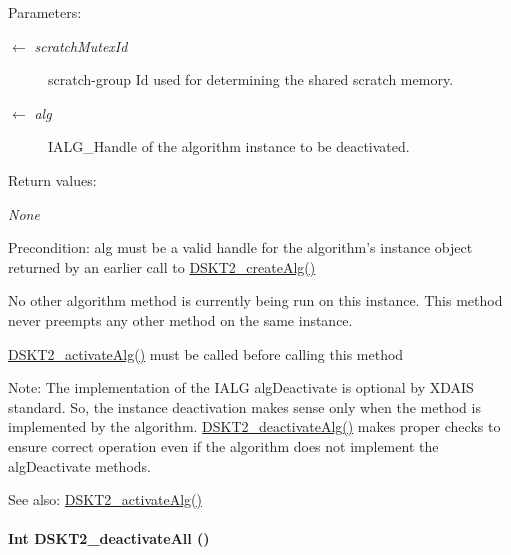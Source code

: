 \begin{Desc}
\item[Parameters:]
\begin{description}
\item[\mbox{$\leftarrow$} {\em scratch\-Mutex\-Id}]scratch-group Id used for determining the shared scratch memory. \item[\mbox{$\leftarrow$} {\em alg}]IALG\_\-Handle of the algorithm instance to be deactivated.\end{description}
\end{Desc}
\begin{Desc}
\item[Return values:]
\begin{description}
\item[{\em None}]\end{description}
\end{Desc}
\begin{Desc}
\item[Precondition:]alg must be a valid handle for the algorithm's instance object returned by an earlier call to \hyperlink{group___d_s_p_d_s_k_t2_g5528d73c34724bc310404da0dc2fbd69}{DSKT2\_\-create\-Alg()}

No other algorithm method is currently being run on this instance. This method never preempts any other method on the same instance.

\hyperlink{group___d_s_p_d_s_k_t2_gf946d426d6d9a95040d3967fa746cd7a}{DSKT2\_\-activate\-Alg()} must be called before calling this method\end{Desc}
\begin{Desc}
\item[Note:]The implementation of the IALG alg\-Deactivate is optional by XDAIS standard. So, the instance deactivation makes sense only when the method is implemented by the algorithm. \hyperlink{group___d_s_p_d_s_k_t2_g74b6b6feca63328906acade37d23b597}{DSKT2\_\-deactivate\-Alg()} makes proper checks to ensure correct operation even if the algorithm does not implement the alg\-Deactivate methods.\end{Desc}
\begin{Desc}
\item[See also:]\hyperlink{group___d_s_p_d_s_k_t2_gf946d426d6d9a95040d3967fa746cd7a}{DSKT2\_\-activate\-Alg()} \end{Desc}
\hypertarget{group___d_s_p_d_s_k_t2_g2d252c736a3bb828d9f646cc379ac0e2}{
\paragraph[DSKT2\_\-deactivateAll]{\setlength{\rightskip}{0pt plus 5cm}Int DSKT2\_\-deactivate\-All ()}\hfill}
\label{group___d_s_p_d_s_k_t2_g2d252c736a3bb828d9f646cc379ac0e2}


